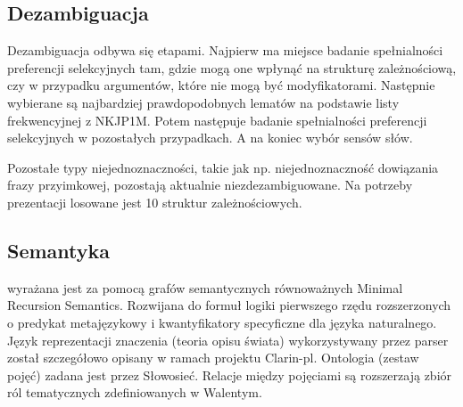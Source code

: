 \documentclass[oneside,pwrcover,withmarginpar,hidelinks,11pt]{article}
\begin{document}
\subsection{Dezambiguacja}
Dezambiguacja odbywa się etapami.
Najpierw ma miejsce badanie spełnialności preferencji selekcyjnych tam, gdzie mogą one wpłynąć na strukturę zależnościową, czy w przypadku argumentów, które nie mogą być modyfikatorami.
Następnie wybierane są najbardziej prawdopodobnych lematów na podstawie listy frekwencyjnej z NKJP1M.
Potem następuje badanie spełnialności preferencji selekcyjnych w pozostałych przypadkach.
A na koniec wybór sensów słów.

Pozostałe typy niejednoznaczności, takie jak np. niejednoznaczność dowiązania frazy przyimkowej, pozostają aktualnie niezdezambiguowane. 
Na potrzeby prezentacji losowane jest 10 struktur zależnościowych. 

\subsection{Semantyka}
wyrażana jest za pomocą grafów semantycznych równoważnych Minimal Recursion Semantics.
Rozwijana do formuł logiki pierwszego rzędu rozszerzonych o predykat metajęzykowy i kwantyfikatory specyficzne dla języka naturalnego.
Język reprezentacji znaczenia (teoria opisu świata) wykorzystywany przez parser został szczegółowo opisany w ramach projektu Clarin-pl.
Ontologia (zestaw pojęć) zadana jest przez Słowosieć.
Relacje między pojęciami są rozszerzają zbiór ról tematycznych zdefiniowanych w Walentym.
\end{document}
